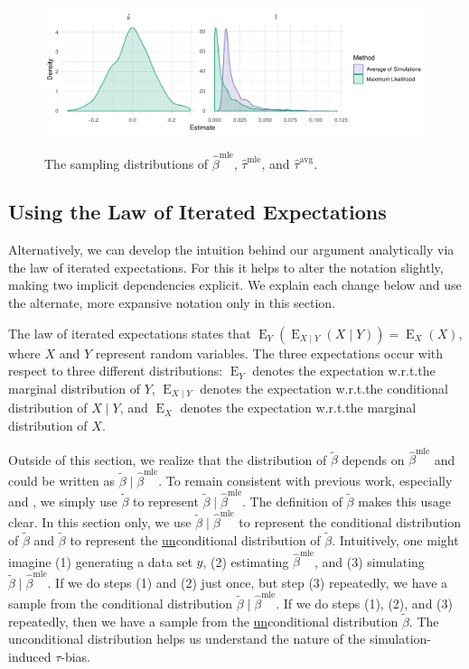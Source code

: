 \documentclass[11pt]{article}
\DeclareMathOperator*{\E}{\text{E}}
\begin{document}
\begin{figure}[h]
\begin{center}
\includegraphics[scale = 0.75]{figs/intuition-sampling.pdf}\\
\vspace{.1in}
\caption{The sampling distributions of $\hat{\beta}^\text{mle}$, $\hat{\tau}^\text{mle}$, and $\hat{\tau}^\text{avg}$.}\label{fig:int-samp}
\end{center}
\end{figure}


\subsection*{Using the Law of Iterated Expectations}

Alternatively, we can develop the intuition behind our argument analytically via the law of iterated expectations. For this it helps to alter the notation slightly, making two implicit dependencies explicit. We explain each change below and use the alternate, more expansive notation only in this section.


The law of iterated expectations states that $\E_Y \left( \E_{X \mid Y}(X \mid Y) \right) = \E_X(X)$, where $X$ and $Y$ represent random variables.
The three expectations occur with respect to three different distributions: $\E_Y$ denotes the expectation w.r.t.\@ the marginal distribution of $Y$, $\E_{X \mid Y}$ denotes the expectation w.r.t.\@ the conditional distribution of $X \mid Y$, and $\E_X$ denotes the expectation w.r.t.\@ the marginal distribution of $X$.


Outside of this section, we realize that the distribution of $\tilde{\beta}$ depends on $\hat{\beta}^\text{mle}$ and could be written as $\tilde{\beta} \mid \hat{\beta}^\text{mle}$.
To remain consistent with previous work, especially \cite{KingTomzWittenberg2000} and \cite{Herron1999}, we simply use $\tilde{\beta}$ to represent $\tilde{\beta} \mid \hat{\beta}^\text{mle}$.
The definition of $\tilde{\beta}$ makes this usage clear.
In this section only, we use $\tilde{\beta} \mid \hat{\beta}^\text{mle}$ to represent the conditional distribution of $\tilde{\beta}$ and $\tilde{\beta}$ to represent the \underline{un}conditional distribution of $\tilde{\beta}$.
Intuitively, one might imagine (1) generating a data set $y$, (2) estimating $\hat{\beta}^\text{mle}$, and (3) simulating $\tilde{\beta} \mid \hat{\beta}^\text{mle}$.
If we do steps (1) and (2) just once, but step (3) repeatedly, we have a sample from the conditional distribution $\tilde{\beta} \mid \hat{\beta}^\text{mle}$.
If we do steps (1), (2), and (3) repeatedly, then we have a sample from the \underline{un}conditional distribution $\tilde{\beta}$.
The unconditional distribution helps us understand the nature of the simulation-induced $\tau$-bias.
\end{document}
